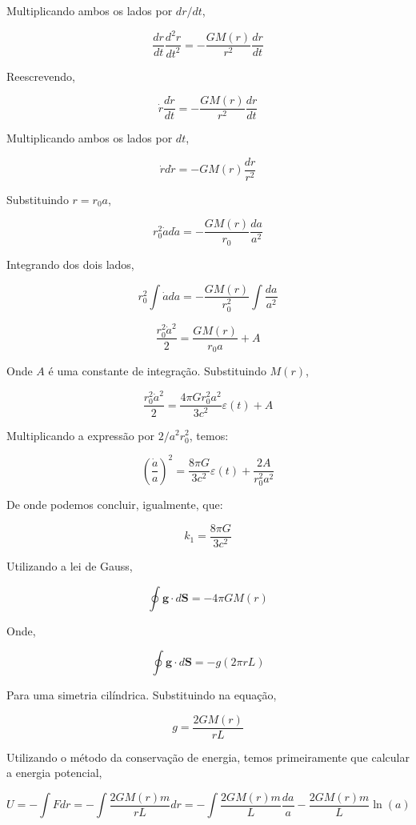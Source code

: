 \documentclass[11pt]{article}
\begin{document}
\begin{pproblem}
\begin{pssolution*}{}{ }
\begin{alternativas}
        Multiplicando ambos os lados por \(dr/dt\),

        \[\frac{dr}{dt} \frac{d^2r}{dt^2} = -\frac{GM(r)}{r^2} \frac{dr}{dt}\]

        Reescrevendo,

        \[\dot{r} \frac{d\dot{r}}{dt} = -\frac{GM(r)}{r^2} \frac{dr}{dt}\]

        Multiplicando ambos os lados por \(dt\),

        \[\dot{r} d\dot{r} = -GM(r) \frac{dr}{r^2}\]

        Substituindo \(r = r_0 a\),

        \[r_0^2 \dot{a} d\dot{a} = -\frac{GM(r)}{r_0} \frac{da}{a^2}\]

        Integrando dos dois lados,

        \[r_0^2 \int \dot{a} da = -\frac{GM(r)}{r_0^2} \int \frac{da}{a^2}\]

        \[\frac{r_0^2 \dot{a}^2}{2} = \frac{GM(r)}{r_0 a} + A\]

        Onde \(A\) é uma constante de integração. Substituindo \(M(r)\),

        \[\frac{r_0^2 \dot{a}^2}{2} = \frac{4\pi G r_0^2 a^2}{3c^2} \varepsilon(t) + A\]

        Multiplicando a expressão por \(2/a^2 r_0^2\), temos:

        \[\left(\frac{\dot{a}}{a}\right)^2 = \frac{8\pi G}{3c^2} \varepsilon(t) + \frac{2A}{r_0^2 a^2}\]

        De onde podemos concluir, igualmente, que:

        \[\boxed{k_1 = \frac{8\pi G}{3c^2}}\]

        \item Utilizando a lei de Gauss,

        \[\oint \mathbf{g} \cdot d\mathbf{S} = -4\pi G M(r)\]

        Onde,

        \[\oint \mathbf{g} \cdot d\mathbf{S} = -g(2\pi r L)\]

        Para uma simetria cilíndrica. Substituindo na equação,

        \[g = \frac{2G M(r)}{r L}\]

        Utilizando o método da conservação de energia, temos primeiramente que calcular a energia potencial,

        \[U = -\int F dr = -\int \frac{2GM(r)m}{rL} dr = -\int \frac{2GM(r)m}{L} \frac{da}{a} - \frac{2GM(r)m}{L} \ln(a)\]


\end{alternativas}
\end{pssolution*}
\end{pproblem}
\end{document}
